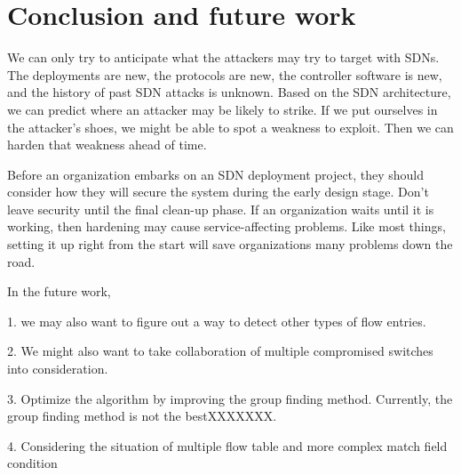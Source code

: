 \chapter{Conclusion and future work}
\label{conclusion}

We can only try to anticipate what the attackers may try to target with SDNs.  The deployments are new, the protocols are new, the controller software is new, and the history of past SDN attacks is unknown.  Based on the SDN architecture, we can predict where an attacker may be likely to strike.  If we put ourselves in the attacker’s shoes, we might be able to spot a weakness to exploit. Then we can harden that weakness ahead of time.

Before an organization embarks on an SDN deployment project, they should consider how they will secure the system during the early design stage.  Don’t leave security until the final clean-up phase.  If an organization waits until it is working, then hardening  may cause service-affecting problems.  Like most things, setting it up right from the start will save organizations many problems down the road.

In the future work, 

1. we may also want to figure out a way to detect other types of flow entries.

2. We might also want to take collaboration of multiple compromised switches into consideration.

3. Optimize the algorithm by improving the group finding method. Currently, the group finding method is not the bestXXXXXXX.

4. Considering the situation of multiple flow table and more complex match field condition